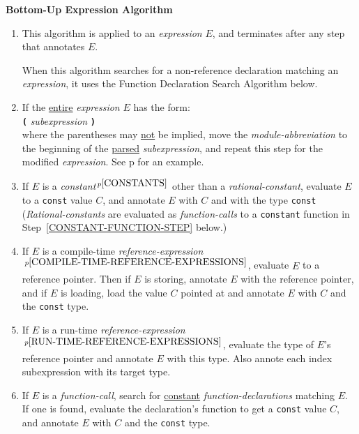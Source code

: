 \documentclass[12pt]{article}
\newcommand{\TT}[1]{{\tt \bfseries #1}}
\newcommand{\pagref}[1]{p\pageref{#1}}
\newcommand{\pagnote}[1]{$\,^{p\pageref{#1}}$}
\begin{document}
\centerline{\bf Bottom-Up Expression Algorithm}
\begin{enumerate}

\item This algorithm is applied to an {\em expression} $E$, and
terminates after any step that annotates $E$.

When this algorithm searches for a non-reference
declaration matching an {\em expression},
it uses the Function Declaration Search Algorithm below.

\item\label{MODULE-PROPAGATION-STEP}
If the \underline{entire} {\em expression} $E$ has the form: \\
\hspace*{2in}{\em module-abbreviation} \TT{(} {\em subexpression} \TT{)} \\
where the parentheses may \underline{not}
be implied, move the {\em module-abbreviation}
to the beginning of the \underline{parsed} {\em subexpression}, and
repeat this step for the modified {\em expression}.
See \pagref{MA-SYNTACTIC-SUGAR} for an example.

\item\label{CONSTANT-STEP}
If $E$ is a {\em constant}\pagnote{CONSTANTS} other than
a {\em rational-constant}, evaluate $E$
to a {\tt const} value $C$, and annotate $E$
with $C$ and with the type {\tt const}
({\em Rational-constants} are evaluated as {\em function-calls} to
a {\tt constant} function in Step~\ref{CONSTANT-FUNCTION-STEP} below.)

\item\label{COMPILE-TIME-REFERENCE-EXPRESSION-STEP}
If $E$ is a compile-time
{\em reference-expression}\pagnote{COMPILE-TIME-REFERENCE-EXPRESSIONS},
evaluate $E$ to a reference pointer.  Then if $E$ is storing, annotate
$E$ with the reference pointer, and if $E$ is loading, load the value $C$
pointed at and annotate $E$ with $C$ and the {\tt const} type.

\item\label{RUN-TIME-REFERENCE-EXPRESSION-STEP}
If $E$ is a run-time
{\em reference-expression}\pagnote{RUN-TIME-REFERENCE-EXPRESSIONS},
evaluate the type of $E$'s reference pointer and annotate
$E$ with this type.  Also annote each index subexpression with its
target type.

\item\label{CONSTANT-FUNCTION-STEP}
If $E$ is a {\em function-call},
search for \underline{constant} {\em function-declarations}
matching $E$.  If one is found,
evaluate the declaration's function to get a {\tt const} value $C$,
and annotate $E$ with $C$ and the {\tt const} type.


\end{enumerate}
\end{document}
